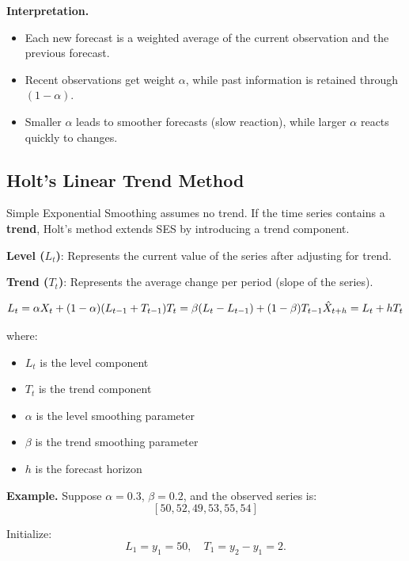 \documentclass[10pt,a4paper]{article}
\begin{document}
	\medskip
	
	\textbf{Interpretation.}
	\begin{itemize}
	\item Each new forecast is a weighted average of the current observation and the previous forecast.
	\item Recent observations get weight $\alpha$, while past information is retained through $(1-\alpha)$.
	\item Smaller $\alpha$ leads to smoother forecasts (slow reaction), while larger $\alpha$ reacts quickly to changes.
	\end{itemize}
	
	
	\subsection{Holt's Linear Trend Method}
	
	Simple Exponential Smoothing assumes no trend. If the time series contains a \textbf{trend}, Holt's method extends SES by introducing a trend component.
	
	\textbf{Level ($L_t$)}: Represents the current value of the series after adjusting for trend.
	
	\textbf{Trend ($T_t$)}: Represents the average change per period (slope of the series).
	
	\[
	L_t = \alpha X_t + (1 - \alpha)(L_{t-1} + T_{t-1}) \\
	T_t = \beta (L_t - L_{t-1}) + (1 - \beta)T_{t-1} \\
	\hat{X}_{t+h} = L_t + hT_t
	\]
	
	where:
	\begin{itemize}
	\item $L_t$ is the level component
	\item $T_t$ is the trend component
	\item $\alpha$ is the level smoothing parameter
	\item $\beta$ is the trend smoothing parameter
	\item $h$ is the forecast horizon
	\end{itemize}
	
	\medskip
	
	\textbf{Example.} Suppose $\alpha = 0.3$, $\beta = 0.2$, and the observed series is:
	\[
	[50, 52, 49, 53, 55, 54]
	\]
	
	Initialize:
	\[
	L_1 = y_1 = 50, \quad T_1 = y_2 - y_1 = 2.
	\]
	
	\medskip
	
\end{document}
